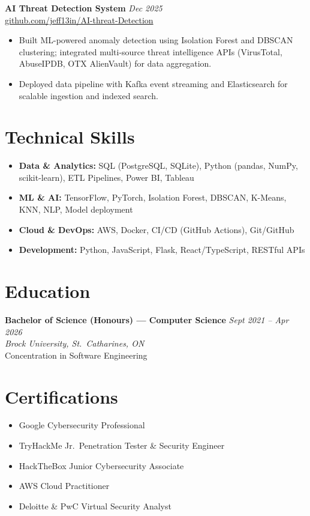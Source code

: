 \documentclass[10pt, letterpaper]{article}
\begin{document}
\noindent\textbf{AI Threat Detection System} \hfill \textit{Dec 2025} \\
\href{https://github.com/jeff13in/AI-threat-Detection}{\small github.com/jeff13in/AI-threat-Detection}
\begin{itemize}
  \item Built ML-powered anomaly detection using Isolation Forest and DBSCAN clustering; integrated multi-source threat intelligence APIs (VirusTotal, AbuseIPDB, OTX AlienVault) for data aggregation.
  \item Deployed data pipeline with Kafka event streaming and Elasticsearch for scalable ingestion and indexed search.
\end{itemize}

\section{Technical Skills}
\begin{itemize}[label={}, leftmargin=0pt, itemsep=2pt, topsep=2pt]
  \item \textbf{Data \& Analytics:} SQL (PostgreSQL, SQLite), Python (pandas, NumPy, scikit-learn), ETL Pipelines, Power BI, Tableau
  \item \textbf{ML \& AI:} TensorFlow, PyTorch, Isolation Forest, DBSCAN, K-Means, KNN, NLP, Model deployment
  \item \textbf{Cloud \& DevOps:} AWS, Docker, CI/CD (GitHub Actions), Git/GitHub
  \item \textbf{Development:} Python, JavaScript, Flask, React/TypeScript, RESTful APIs
\end{itemize}

\section{Education}

\noindent\textbf{Bachelor of Science (Honours) --- Computer Science} \hfill \textit{Sept 2021 -- Apr 2026} \\
\textit{Brock University, St.\ Catharines, ON} \\
\small Concentration in Software Engineering

\section{Certifications}
\begin{itemize}[itemsep=1pt, topsep=3pt]
  \item Google Cybersecurity Professional
  \item TryHackMe Jr.\ Penetration Tester \& Security Engineer
  \item HackTheBox Junior Cybersecurity Associate
  \item AWS Cloud Practitioner
  \item Deloitte \& PwC Virtual Security Analyst
\end{itemize}
\end{document}
